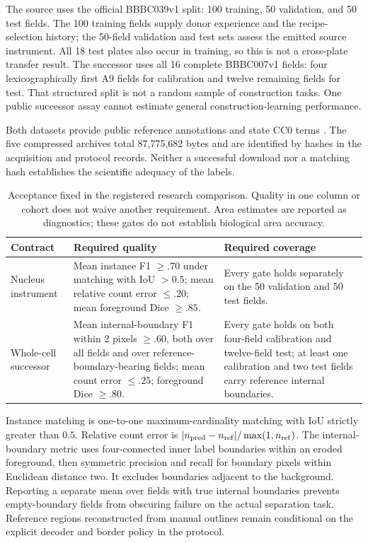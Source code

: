 The source uses the official BBBC039v1 split: 100 training, 50 validation, and 50 test fields. The 100 training fields supply donor experience and the recipe-selection history; the 50-field validation and test sets assess the emitted source instrument. All 18 test plates also occur in training, so this is not a cross-plate transfer result. The successor uses all 16 complete BBBC007v1 fields: four lexicographically first A9 fields for calibration and twelve remaining fields for test. That structured split is not a random sample of construction tasks. One public successor assay cannot estimate general construction-learning performance.

Both datasets provide public reference annotations and state CC0 terms \citep{bbbc039,bbbc007}. The five compressed archives total 87,775,682 bytes and are identified by hashes in the acquisition and protocol records. Neither a successful download nor a matching hash establishes the scientific adequacy of the labels.

\begin{table}[htbp]
\centering\small
\begin{tabularx}{\linewidth}{@{}P{1.22in}YY@{}}
\toprule
\textbf{Contract} & \textbf{Required quality} & \textbf{Required coverage}\\
\midrule
Nucleus instrument & Mean instance F1 $\geq .70$ under matching with IoU $>0.5$; mean relative count error $\leq .20$; mean foreground Dice $\geq .85$. & Every gate holds separately on the 50 validation and 50 test fields.\\
Whole-cell successor & Mean internal-boundary F1 within 2 pixels $\geq .60$, both over all fields and over reference-boundary-bearing fields; mean count error $\leq .25$; foreground Dice $\geq .80$. & Every gate holds on both four-field calibration and twelve-field test; at least one calibration and two test fields carry reference internal boundaries.\\
\bottomrule
\end{tabularx}
\caption{Acceptance fixed in the registered research comparison. Quality in one column or cohort does not waive another requirement. Area estimates are reported as diagnostics; these gates do not establish biological area accuracy.}
\label{tab:microscopy-contracts}
\end{table}

Instance matching is one-to-one maximum-cardinality matching with IoU strictly greater than $0.5$. Relative count error is $|n_{\rm pred}-n_{\rm ref}|/\max(1,n_{\rm ref})$. The internal-boundary metric uses four-connected inner label boundaries within an eroded foreground, then symmetric precision and recall for boundary pixels within Euclidean distance two. It excludes boundaries adjacent to the background. Reporting a separate mean over fields with true internal boundaries prevents empty-boundary fields from obscuring failure on the actual separation task. Reference regions reconstructed from manual outlines remain conditional on the explicit decoder and border policy in the protocol.

